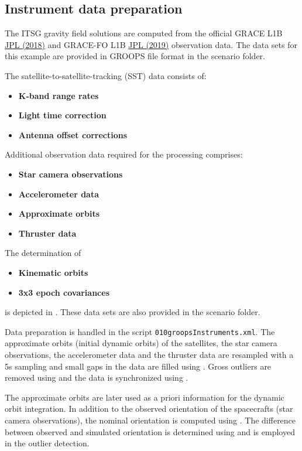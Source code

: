 \subsection{Instrument data preparation}\label{cookbook.gravityFieldGrace:metadata}
The ITSG gravity field solutions are computed from the official GRACE L1B \href{https://doi.org/10.5067/GRJPL-L1B03}{JPL (2018)}
and GRACE-FO L1B \href{https://doi.org/10.5067/GFL1B-ASJ04}{JPL (2019)} observation data. The data sets for this example are provided
in GROOPS file format in the scenario folder.

The satellite-to-satellite-tracking (SST) data consists of:
\begin{itemize}
  \item \textbf{K-band range rates}
  \item \textbf{Light time correction}
  \item \textbf{Antenna offset corrections}
\end{itemize}

Additional observation data required for the processing comprises:
\begin{itemize}
  \item \textbf{Star camera observations}
  \item \textbf{Accelerometer data}
  \item \textbf{Approximate orbits} %
  \item \textbf{Thruster data}
\end{itemize}

The determination of
\begin{itemize}
  \item \textbf{Kinematic orbits}
  \item \textbf{3x3 epoch covariances}
\end{itemize}
is depicted in .
These data sets are also provided in the scenario folder.

Data preparation is handled in the script \verb|010groopsInstruments.xml|. The approximate orbits (initial dynamic orbits)
of the satellites, the star camera observations, the accelerometer data and the thruster data are resampled with a 5s sampling
and small gaps in the data are filled using . Gross outliers are removed using 
and the data is synchronized using  .

The approximate orbits are later used as a priori information for the dynamic orbit integration.
In addition to the observed orientation of the spacecrafts (star camera observations),
the nominal orientation is computed using . The difference between
observed and simulated orientation is determined using 
and is employed in the outlier detection.

